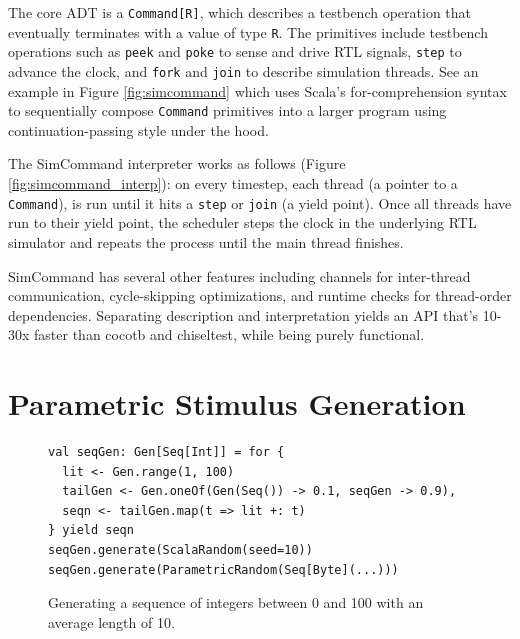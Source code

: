 \documentclass[sigplan,review,nonacm,9pt]{acmart}
\begin{document}
The core ADT is a \texttt{Command[R]}, which describes a testbench operation that eventually terminates with a value of type \texttt{R}.
The primitives include testbench operations such as \texttt{peek} and \texttt{poke} to sense and drive RTL signals, \texttt{step} to advance the clock, and \texttt{fork} and \texttt{join} to describe simulation threads.
See an example in Figure \ref{fig:simcommand} which uses Scala's for-comprehension syntax to sequentially compose \texttt{Command} primitives into a larger program using continuation-passing style under the hood.

The SimCommand interpreter works as follows (Figure \ref{fig:simcommand_interp}): on every timestep, each thread (a pointer to a \texttt{Command}), is run until it hits a \texttt{step} or \texttt{join} (a yield point).
Once all threads have run to their yield point, the scheduler steps the clock in the underlying RTL simulator and repeats the process until the main thread finishes.

SimCommand has several other features including channels for inter-thread communication, cycle-skipping optimizations, and runtime checks for thread-order dependencies.
Separating description and interpretation yields an API that's 10-30x faster than cocotb and chiseltest, while being purely functional.


\section{Parametric Stimulus Generation}

\begin{figure}[b]
\begin{verbatim}
val seqGen: Gen[Seq[Int]] = for {
  lit <- Gen.range(1, 100)
  tailGen <- Gen.oneOf(Gen(Seq()) -> 0.1, seqGen -> 0.9),
  seqn <- tailGen.map(t => lit +: t)
} yield seqn
seqGen.generate(ScalaRandom(seed=10))
seqGen.generate(ParametricRandom(Seq[Byte](...)))
\end{verbatim}
\caption{Generating a sequence of integers between 0 and 100 with an average length of 10.}
\label{fig:randomapi}
\end{figure}
\end{document}
